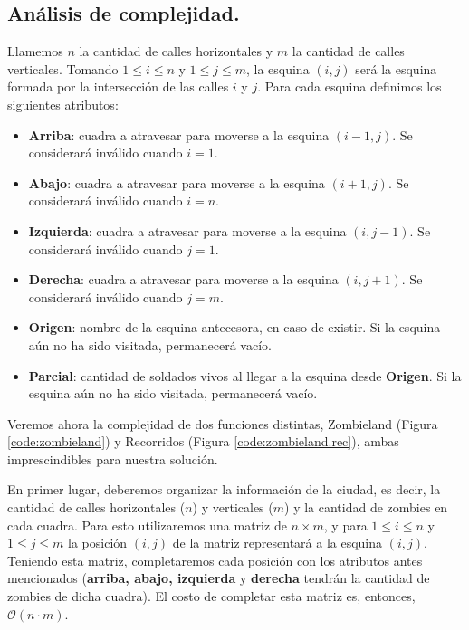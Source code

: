 
\subsection{Análisis de complejidad.}

\vspace*{0.3cm}

Llamemos $n$ la cantidad de calles horizontales y $m$ la cantidad de calles verticales.  Tomando $1 \leq i \leq n$ y $1 \leq j \leq m$, la esquina $(i,j)$ será la esquina formada por la intersección de las calles $i$ y $j$.  Para cada esquina definimos los siguientes atributos:

\begin{itemize}
	\item {\bf Arriba}: cuadra a atravesar para moverse a la esquina $(i-1,j)$. Se considerará inválido cuando $i = 1$.
	\item {\bf Abajo}: cuadra a atravesar para moverse a la esquina $(i+1,j)$. Se considerará inválido cuando $i = n$.
	\item {\bf Izquierda}: cuadra a atravesar para moverse a la esquina $(i,j-1)$. Se considerará inválido cuando $j = 1$.
	\item {\bf Derecha}: cuadra a atravesar para moverse a la esquina $(i,j+1)$. Se considerará inválido cuando $j = m$.
	\item {\bf Origen}: nombre de la esquina antecesora, en caso de existir.  Si la esquina aún no ha sido visitada, permanecerá vacío.
	\item {\bf Parcial}: cantidad de soldados vivos al llegar a la esquina desde {\bf Origen}. Si la esquina aún no ha sido visitada, permanecerá vacío.
\end{itemize}

Veremos ahora la complejidad de dos funciones distintas, {\sc Zombieland} (Figura \ref{code:zombieland}) y {\sc Recorridos} (Figura \ref{code:zombieland.rec}), ambas imprescindibles para nuestra solución.

En primer lugar, deberemos organizar la información de la ciudad, es decir, la cantidad de calles horizontales ($n$) y verticales ($m$) y la cantidad de zombies en cada cuadra.  Para esto utilizaremos una matriz de $n \times m$, y para $1 \leq i \leq n$ y $1 \leq j \leq m$ la posición $(i,j)$ de la matriz representará a la esquina $(i,j)$. Teniendo esta matriz, completaremos cada posición con los atributos antes mencionados ({\bf arriba, abajo, izquierda} y {\bf derecha} tendrán la cantidad de zombies de dicha cuadra). El costo de completar esta matriz es, entonces, $\mathcal{O}(n \cdot m)$.

